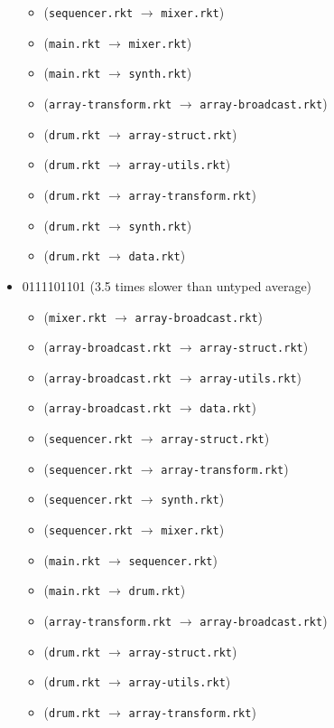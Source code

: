 \documentclass{article}
\newcommand{\mono}[1]{\texttt{#1}}
\begin{document}
\begin{itemize}
\begin{itemize}
  \item (\mono{sequencer.rkt} $\rightarrow$ \mono{mixer.rkt})
  \item (\mono{main.rkt} $\rightarrow$ \mono{mixer.rkt})
  \item (\mono{main.rkt} $\rightarrow$ \mono{synth.rkt})
  \item (\mono{array-transform.rkt} $\rightarrow$ \mono{array-broadcast.rkt})
  \item (\mono{drum.rkt} $\rightarrow$ \mono{array-struct.rkt})
  \item (\mono{drum.rkt} $\rightarrow$ \mono{array-utils.rkt})
  \item (\mono{drum.rkt} $\rightarrow$ \mono{array-transform.rkt})
  \item (\mono{drum.rkt} $\rightarrow$ \mono{synth.rkt})
  \item (\mono{drum.rkt} $\rightarrow$ \mono{data.rkt})
  \end{itemize}
\item 0111101101 (3.5 times slower than untyped average)
  \begin{itemize}
  \item (\mono{mixer.rkt} $\rightarrow$ \mono{array-broadcast.rkt})
  \item (\mono{array-broadcast.rkt} $\rightarrow$ \mono{array-struct.rkt})
  \item (\mono{array-broadcast.rkt} $\rightarrow$ \mono{array-utils.rkt})
  \item (\mono{array-broadcast.rkt} $\rightarrow$ \mono{data.rkt})
  \item (\mono{sequencer.rkt} $\rightarrow$ \mono{array-struct.rkt})
  \item (\mono{sequencer.rkt} $\rightarrow$ \mono{array-transform.rkt})
  \item (\mono{sequencer.rkt} $\rightarrow$ \mono{synth.rkt})
  \item (\mono{sequencer.rkt} $\rightarrow$ \mono{mixer.rkt})
  \item (\mono{main.rkt} $\rightarrow$ \mono{sequencer.rkt})
  \item (\mono{main.rkt} $\rightarrow$ \mono{drum.rkt})
  \item (\mono{array-transform.rkt} $\rightarrow$ \mono{array-broadcast.rkt})
  \item (\mono{drum.rkt} $\rightarrow$ \mono{array-struct.rkt})
  \item (\mono{drum.rkt} $\rightarrow$ \mono{array-utils.rkt})
  \item (\mono{drum.rkt} $\rightarrow$ \mono{array-transform.rkt})

\end{itemize}
\end{itemize}
\end{document}
